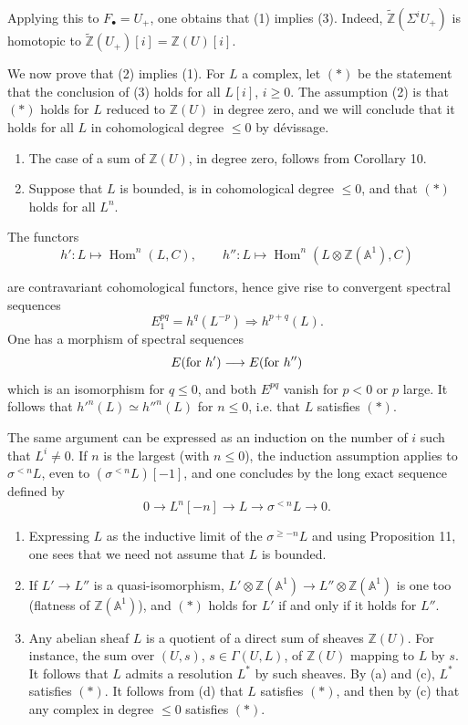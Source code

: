 \documentclass[11pt]{article}
\newcommand{\Aone}{\mathbb A^1}
\newcommand{\Z}{\mathbb Z}
\newcommand{\Hom}{\operatorname{Hom}}
\newcommand{\ZZ}{\widetilde{\Z}}
\theoremstyle{deligne}
\begin{document}
Applying this to \(F_\bullet=U_+\), one obtains that (1) implies (3). Indeed, \(\ZZ(\Sigma^iU_+)\) is homotopic to \(\ZZ(U_+)[i]=\Z(U)[i]\).

We now prove that (2) implies (1). For \(L\) a complex, let \((*)\) be the statement that the conclusion of (3) holds for all \(L[i]\), \(i\ge0\). The assumption (2) is that \((*)\) holds for \(L\) reduced to \(\Z(U)\) in degree zero, and we will conclude that it holds for all \(L\) in cohomological degree \(\le0\) by dévissage.
\begin{enumerate}[label=(\alph*)]
\item The case of a sum of \(\Z(U)\), in degree zero, follows from Corollary 10.
\item Suppose that \(L\) is bounded, is in cohomological degree \(\le0\), and that \((*)\) holds for all \(L^n\).
\end{enumerate}
The functors
\[
  h':L\longmapsto \Hom^n(L,C),\qquad
  h'':L\longmapsto \Hom^n(L\otimes\Z(\Aone),C) \tag{3.6}
\]


are contravariant cohomological functors, hence give rise to convergent spectral sequences
\[
E_1^{pq}=h^q(L^{-p})\Rightarrow h^{p+q}(L).
\]
One has a morphism of spectral sequences
\[
E(\hbox{for }h')\longrightarrow E(\hbox{for }h'')
\]
which is an isomorphism for \(q\le0\), and both \(E^{pq}\) vanish for \(p<0\) or \(p\) large. It follows that \(h'^n(L)\simeq h''^n(L)\) for \(n\le0\), i.e. that \(L\) satisfies \((*)\).

The same argument can be expressed as an induction on the number of \(i\) such that \(L^i\ne0\). If \(n\) is the largest (with \(n\le0\)), the induction assumption applies to \(\sigma^{<n}L\), even to \((\sigma^{<n}L)[-1]\), and one concludes by the long exact sequence defined by
\[
0\longrightarrow L^n[-n]\longrightarrow L\longrightarrow\sigma^{<n}L\longrightarrow0.
\]

\begin{enumerate}[label=(\alph*),start=3]
\item Expressing \(L\) as the inductive limit of the \(\sigma^{\ge-n}L\) and using Proposition 11, one sees that we need not assume that \(L\) is bounded.
\item If \(L'\to L''\) is a quasi-isomorphism, \(L'\otimes\Z(\Aone)\to L''\otimes\Z(\Aone)\) is one too (flatness of \(\Z(\Aone)\)), and \((*)\) holds for \(L'\) if and only if it holds for \(L''\).
\item Any abelian sheaf \(L\) is a quotient of a direct sum of sheaves \(\Z(U)\). For instance, the sum over \((U,s)\), \(s\in\Gamma(U,L)\), of \(\Z(U)\) mapping to \(L\) by \(s\). It follows that \(L\) admits a resolution \(L^*\) by such sheaves. By (a) and (c), \(L^*\) satisfies \((*)\). It follows from (d) that \(L\) satisfies \((*)\), and then by (c) that any complex in degree \(\le0\) satisfies \((*)\).
\end{enumerate}
\end{document}
